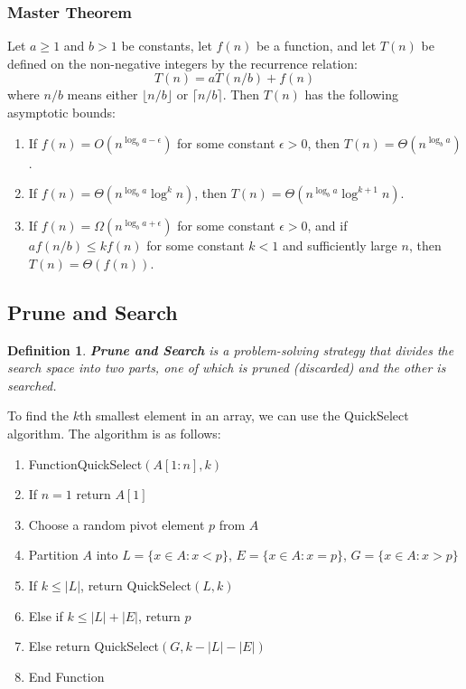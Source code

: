 \documentclass[conference]{IEEEtran}
\newtheorem*{definition}{Definition}
\begin{document}
\subsubsection{Master Theorem}
Let $a \geq 1$ and $b > 1$ be constants, let $f(n)$ be a function, and let $T(n)$ be defined on the non-negative integers by the recurrence relation: \[
    T(n) = aT(n/b) + f(n)
\]
where $n/b$ means either $\lfloor n/b \rfloor$ or $\lceil n/b \rceil$. Then $T(n)$ has the following asymptotic bounds: \begin{enumerate}
    \item If $f(n) = O(n^{\log_b a - \epsilon})$ for some constant $\epsilon > 0$, then $T(n) = \Theta(n^{\log_b a})$.
    \item If $f(n) = \Theta(n^{\log_b a} \log^k n)$, then $T(n) = \Theta(n^{\log_b a} \log^{k+1} n)$.
    \item If $f(n) = \Omega(n^{\log_b a + \epsilon})$ for some constant $\epsilon > 0$, and if $a f(n/b) \leq k f(n)$ for some constant $k < 1$ and sufficiently large $n$, then $T(n) = \Theta(f(n))$.
\end{enumerate}

\subsection{Prune and Search}

\begin{definition}
    \textbf{Prune and Search} is a problem-solving strategy that divides the search space into two parts, one of which is pruned (discarded) and the other is searched.
\end{definition}

To find the $k$th smallest element in an array, we can use the QuickSelect algorithm. The algorithm is as follows:
\begin{enumerate}
    \item Function{QuickSelect}{$(A[1:n], k)$}
    \item If $n = 1$ return $A[1]$
    \item Choose a random pivot element $p$ from $A$
    \item Partition $A$ into $L = \{x \in A : x < p\}$, $E = \{x \in A : x = p\}$, $G = \{x \in A : x > p\}$
    \item If $k \leq |L|$, return QuickSelect$(L, k)$
    \item Else if $k \leq |L| + |E|$, return $p$
    \item Else return QuickSelect$(G, k - |L| - |E|)$
    \item End Function
\end{enumerate}
\end{document}
